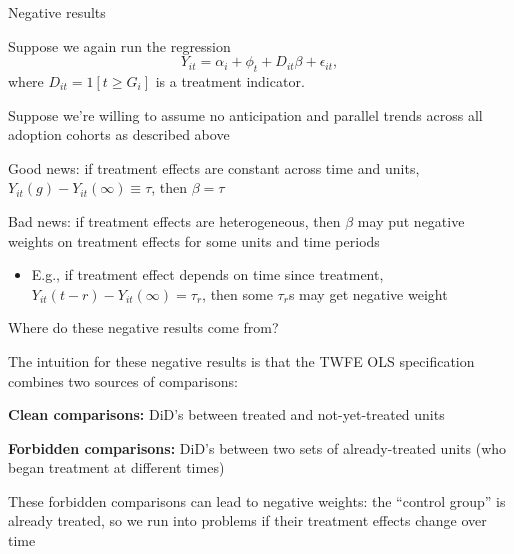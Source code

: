 \documentclass[aspectratio = 169, 13pt]{beamer}
\begin{document}
\begin{frame}{Negative results}
  \begin{wideitemize}
    \item
    Suppose we again run the regression
    \vspace{-3mm}
    $$Y_{it} = \alpha_i + \phi_t + D_{it} \beta  + \epsilon_{it}, $$
    \noindent where $D_{it} = 1[t \geq G_i]$ is a treatment indicator. 
    
    \item
    Suppose we're willing to assume no anticipation and  parallel trends across all adoption cohorts as described above

    \pause
    \vspace{-3mm}
    \item
    Good news: if treatment effects are constant across time and units, $Y_{it}(g) - Y_{it}(\infty) \equiv \tau$, then $\beta = \tau$

    \pause
    \vspace{-3mm}
    \item
    Bad news: if treatment effects are heterogeneous, then $\beta$ may put negative weights on treatment effects for some units and time periods
    \begin{itemize}
      \item
            E.g., if treatment effect depends on time since treatment, $Y_{it}(t-r) - Y_{it}(\infty) = \tau_{r}$, then some $\tau_r$s may get negative weight
    \end{itemize}
  \end{wideitemize}
\end{frame}

\begin{frame}{Where do these negative results come from?}
  \begin{wideitemize}
    \item
    The intuition for these negative results is that the TWFE OLS specification combines two sources of comparisons:

    \medskip

    \begin{enumerate}
      {\normalsize
      \item
            \textbf{Clean comparisons:} DiD's between treated and not-yet-treated units

            \medskip

      \item
            \textbf{Forbidden comparisons:} DiD's between two sets of already-treated units (who began treatment at different times)
            }
    \end{enumerate}

    \item
    These forbidden comparisons can lead to negative weights: the ``control group'' is already treated, so we run into problems if their treatment effects change over time
  \end{wideitemize}
\end{frame}
\end{document}
